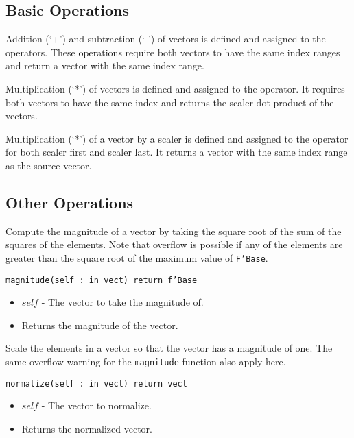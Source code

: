 \documentclass[10pt, openany]{book}
\newcommand{\function}[1]{\texttt{#1}}
\newcommand{\datatype}[1]{\texttt{#1}}
\begin{document}
\subsection{Basic Operations}
Addition (`+') and subtraction (`-') of vectors is defined and assigned to the operators.  These operations require both vectors to have the same index ranges and return a vector with the same index range.

Multiplication (`*') of vectors is defined and assigned to the operator.  It requires both vectors to have the same index and returns the scaler dot product of the vectors.

Multiplication (`*') of a vector by a scaler is defined and assigned to the operator for both scaler first and scaler last.  It returns a vector with the same index range as the source vector.

\subsection{Other Operations}

Compute the magnitude of a vector by taking the square root of the sum of the squares of the elements.  Note that overflow is possible if any of the elements are greater than the square root of the maximum value of \datatype{F'Base}.

\function{magnitude(self : in vect) return f'Base}
\begin{itemize}
  \item $self$ - The vector to take the magnitude of.
  \item Returns the magnitude of the vector.
\end{itemize}

Scale the elements in a vector so that the vector has a magnitude of one.  The same overflow warning for the \function{magnitude} function also apply here.

\function{normalize(self : in vect) return vect}
\begin{itemize}
  \item $self$ - The vector to normalize.
  \item Returns the normalized vector.
\end{itemize}

\clearpage
{}
\nocite{NA3rd}


\end{document}
